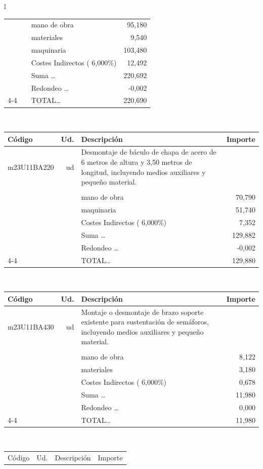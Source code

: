 \documentclass{book}%
\begin{document}
\begin{longtable}{l}
\begin{tabular}{l r p{60mm} r}
&&mano de obra&    95,180\\%
&&materiales&     9,540\\%
&&maquinaria&   103,480\\%
&&Costes Indirectos (     6,000\%)&    12,492\\%
&&Suma \ldots&   220,692\\%
&&Redondeo \ldots&    {-}0,002\\%
\cline{4-4}%
&&TOTAL\ldots&   220,690\\%
\end{tabular}\\%
\begin{tabular}{l r p{60mm} r}%
Código&Ud.&Descripción&Importe\\%
\hline%
m23U11BA220&ud&Desmontaje de báculo de chapa de acero de 6 metros de altura y 3,50 metros de longitud, incluyendo medios auxiliares y pequeño material.&\\%
&&&\\%
&&mano de obra&    70,790\\%
&&maquinaria&    51,740\\%
&&Costes Indirectos (     6,000\%)&     7,352\\%
&&Suma \ldots&   129,882\\%
&&Redondeo \ldots&    {-}0,002\\%
\cline{4-4}%
&&TOTAL\ldots&   129,880\\%
\end{tabular}\\%
\begin{tabular}{l r p{60mm} r}%
Código&Ud.&Descripción&Importe\\%
\hline%
m23U11BA430&ud&Montaje o desmontaje de brazo soporte existente para sustentación de semáforos, incluyendo medios auxiliares y pequeño material.&\\%
&&&\\%
&&mano de obra&     8,122\\%
&&materiales&     3,180\\%
&&Costes Indirectos (     6,000\%)&     0,678\\%
&&Suma \ldots&    11,980\\%
&&Redondeo \ldots&     0,000\\%
\cline{4-4}%
&&TOTAL\ldots&    11,980\\%
\end{tabular}\\%
\begin{tabular}{l r p{60mm} r}%
Código&Ud.&Descripción&Importe\\%

\end{tabular}
\end{longtable}
\end{document}
